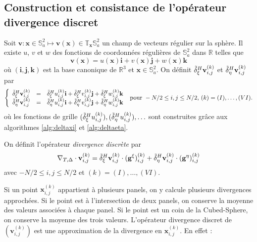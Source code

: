 \subsection{Construction et consistance de l'opérateur divergence discret}

Soit $\mathbf{v} : \mathbf{x} \in \mathbb{S}_a^2 \mapsto \mathbf{v}(\mathbf{x}) \in \mathbb{T}_{\mathbf{x}} \mathbb{S}_a^2$ un champ de vecteurs régulier sur la sphère. Il existe $u$, $v$ et $w$ des fonctions de coordonnées régulières de $\mathbb{S}_a^2$ dans $\mathbb{R}$ telles que
\begin{equation}
\mathbf{v}(\mathbf{x}) = u(\mathbf{x}) \mathbf{i} + v (\mathbf{x}) \mathbf{j} + w(\mathbf{x}) \mathbf{k}
\end{equation}
où $(\mathbf{i}, \mathbf{j}, \mathbf{k})$ est la base canonique de $\mathbb{R}^3$ et $\mathbf{x} \in \mathbb{S}_a^2$. On définit $\tilde{\delta}^H_{\xi} \mathbf{v}_{i,j}^{(k)}$ et $\tilde{\delta}^H_{\eta} \mathbf{v}_{i,j}^{(k)}$ par
\begin{equation}
\left\lbrace
\begin{array}{rcl}
\tilde{\delta}^H_{\xi} \mathbf{v}_{i,j}^{(k)} & = & \tilde{\delta}^H_{\xi} u_{i,j}^{(k)} \mathbf{i} + \tilde{\delta}^H_{\xi} v_{i,j}^{(k)} \mathbf{j} + \tilde{\delta}^H_{\xi} w_{i,j}^{(k)} \mathbf{k} \\
\tilde{\delta}^H_{\eta} \mathbf{v}_{i,j}^{(k)} & = & \tilde{\delta}^H_{\eta} u_{i,j}^{(k)} \mathbf{i} + \tilde{\delta}^H_{\eta} v_{i,j}^{(k)} \mathbf{j} + \tilde{\delta}^H_{\eta} w_{i,j}^{(k)} \mathbf{k}
\end{array}
\right.
\text{ pour } -N/2 \leq  i,j \leq N/2 \text{, } (k) = (I), \ldots, (VI). 
\label{eq:der_partiel_vect}
\end{equation}
où les fonctions de grille $(\tilde{\delta}^H_{\xi} u_{i,j}^{(k)}), (\tilde{\delta}^H_{\eta} u_{i,j}^{(k)}),  \ldots$ sont construites grâce aux algorithmes \ref{alg:deltaxi} et \ref{alg:deltaeta}.

\begin{definition}
On définit l'opérateur \textit{divergence discrète} par 
\begin{equation}
\nabla_{T,\Delta} \cdot \mathbf{v}_{i,j}^{(k)} = \tilde{\delta}^H_{\xi} \mathbf{v}_{i,j}^{(k)} \cdot ( \mathbf{g}^{\xi} )_{i,j}^{(k)} + \tilde{\delta}^H_{\eta} \mathbf{v}_{i,j}^{(k)} \cdot ( \mathbf{g}^{\eta} )_{i,j}^{(k)}
\end{equation}
avec $-N/2 \leq i,j \leq N/2$ et $(k) = (I), \ldots , (VI)$.
\label{def:divergence_disc}
\end{definition}
Si un point $\mathbf{x}_{i,j}^{(k)}$ appartient à plusieurs panels, on y calcule plusieurs divergences approchées. Si le point est à l'intersection de deux panels, on conserve la moyenne des valeurs associées à chaque panel. Si le point est un coin de la Cubed-Sphere, on conserve la moyenne des trois valeurs.
L'opérateur divergence discret de $(\mathbf{v}_{i,j}^{(k)})$ est une approximation de la divergence en $\mathbf{x}_{i,j}^{(k)}$. En effet :

